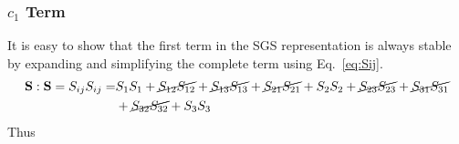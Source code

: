 \subsubsection{$c_{1}$ Term}
It is easy to show that the first term in the SGS representation is always
stable by expanding and simplifying the complete term using
Eq.~\ref{eq:Sij}.
\begin{equation}
    \begin{split}
        \mathbf{S}:\mathbf{S} = S_{ij}S_{ij} = &
            S_{1}S_{1} + \cancel{S_{12} S_{12}} + \cancel{S_{13} S_{13}} +
            \cancel{S_{21}S_{21}} + S_{2} S_{2} + \cancel{S_{23} S_{23}} +
            \cancel{S_{31}S_{31}}                                   \\
        &   + \cancel{S_{32} S_{32}} + S_{3} S_{3}                   \\
    \end{split}
\end{equation}
Thus

